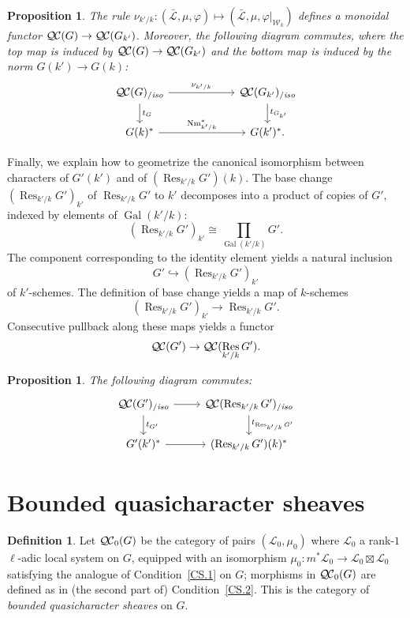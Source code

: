 \documentclass[11pt]{amsart}
\theoremstyle{plain}
\newtheorem{proposition}[theorem]{Proposition}
\theoremstyle{definition}
\newtheorem{definition}[theorem]{Definition}
\theoremstyle{remark}
\newcommand{\Fq}{k}
\DeclareMathOperator{\Gal}{Gal}
\DeclareMathOperator{\Res}{Res}
\DeclareMathOperator{\Nm}{Nm}
\newcommand{\cs}[1]{{\mathcal{#1}}}
\newcommand{\gcs}[1]{{\mathcal{\bar #1}}}
\newcommand{\QC}{{\mathcal{Q\hskip-0.8pt C}}}
\newcommand{\QCb}{{\QC_0}}
\newcommand{\QCiso}[1]{\QC(#1)_{/\textit{iso}}}
\newcommand{\Weil}[1]{\mathcal{W}_{#1}}
\newcommand{\trFrob}[1]{t_{#1}}
\begin{document}
\begin{proposition}\label{prop:basechange}
 The rule $\nu_{k'/k}: (\gcs{L}, \mu, \varphi) \mapsto (\gcs{L}, \mu, \varphi\vert_{\Weil{\Fq}})$ 
 defines a monoidal functor $\QC(G) \to \QC(G_{k'})$. 
 Moreover, the following diagram commutes, 
 where the top map is induced by $\QC(G) \to \QC(G_{k'})$ 
 and the bottom map is induced by the norm $G(k') \rightarrow G(k)$:
\[
\begin{tikzcd}[column sep=60]
\QCiso{G} \rar{\nu_{k'/k}} \dar{\trFrob{G}} & \QCiso{G_{k'}} \dar{\trFrob{G_{k'}}} \\
G(k)^*  \rar{\Nm_{k'/k}^*} & G(k')^*.
\end{tikzcd}
\]
\end{proposition}


Finally, we explain how to geometrize the canonical isomorphism between characters of $G'(k')$ and of $(\Res_{k'/k}G')(k)$.
The base change $(\Res_{k'/k}G')_{k'}$ of $\Res_{k'/k}G'$ to $k'$
decomposes into a product of copies of $G'$, indexed by elements of $\Gal(k'/k)$:
\[
(\Res_{k'/k}G')_{k'} \cong \prod_{\Gal(k'/k)} G'.
\]
The component corresponding to the identity element yields a natural inclusion 
\[
G' \hookrightarrow (\Res_{k'/k}G')_{k'}
\]
of $k'$-schemes.  The definition of base change yields a map of $k$-schemes
\[
(\Res_{k'/k}G')_{k'} \to \Res_{k'/k}G'.
\]
Consecutive pullback along these maps yields a functor
\[
\QC(G') \to \QC(\Res_{k'/k}G').
\]

\begin{proposition}
The following diagram commutes:
\[
\begin{tikzcd}
\QCiso{G'} \dar{\trFrob{G'}} \rar & \QCiso{\Res_{k'/k} G'} \dar{\trFrob{\Res_{k'/k} G'}} \\
 G'(k')^* \rar & (\Res_{k'/k}G')(k)^*
\end{tikzcd}
\]
\end{proposition}

\section{Bounded quasicharacter sheaves}\label{sec:bounded}

\begin{definition}
Let $\QCb(G)$ be the category of pairs $(\cs{L}_0,\mu_0)$ 
where $\cs{L}_0$ a rank-$1$ $\ell$-adic local system on $G$, 
equipped with an isomorphism $\mu_0 : m^* \cs{L}_0 \to \cs{L}_0 \boxtimes \cs{L}_0$ 
satisfying the analogue of Condition~\ref{CS.1} on $G$; 
morphisms in $\QCb(G)$ are defined as in (the second part of) Condition~\ref{CS.2}. 
This is the category of \emph{bounded quasicharacter sheaves} on $G$. 
\end{definition}
\end{document}
